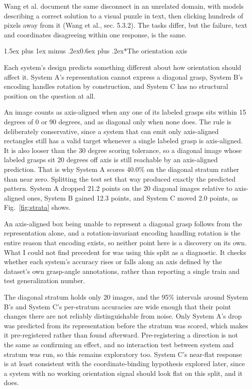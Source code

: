 \documentclass[12pt,letterpaper]{article}
\makeatletter
\renewcommand{\subsection}{\@startsection{subsection}{2}{0pt}%
  {1.5ex plus 1ex minus .2ex}{0.6ex plus .2ex}{\normalsize\itshape}}
\makeatother
\begin{document}
Wang et al. document the same disconnect in an unrelated domain, with
models describing a correct solution to a visual puzzle in text, then
clicking hundreds of pixels away from it (Wang et al., sec. 5.3.2). The
tasks differ, but the failure, text and coordinates disagreeing within
one response, is the same.

\subsection*{The orientation axis}

Each system's design predicts something different about how orientation
should affect it. System A's representation cannot express a diagonal
grasp, System B's encoding handles rotation by construction, and System
C has no structural position on the question at all.

An image counts as axis-aligned when any one of its labeled grasps sits
within 15 degrees of 0 or 90 degrees, and as diagonal only when none
does. The rule is deliberately conservative, since a system that can
emit only axis-aligned rectangles still has a valid target whenever a
single labeled grasp is axis-aligned. It is also looser than the 30
degree scoring tolerance, so a diagonal image whose labeled grasps sit
20 degrees off axis is still reachable by an axis-aligned prediction.
That is why System A scores 40.0\% on the diagonal stratum rather than
near zero. Splitting the test set that way
produced exactly the predicted pattern. System A dropped 21.2 points on
the 20 diagonal images relative to axis-aligned ones, System B gained
12.3 points, and System C moved 2.0 points, as Fig.~\ref{fig:strata}
shows.

An axis-aligned box being unable to represent a diagonal grasp follows
from the representation alone, and a rotation-invariant encoding
handling rotation is the entire reason that encoding exists, so neither
point here is a discovery on its own. What I could not find precedent
for was using this split as a diagnostic. It checks whether each
system's accuracy rises or falls along an axis defined by the dataset's
own grasp-angle annotations, rather than reporting a single train and
test generalization number.

The diagonal stratum holds only 20 images, and the 95\% intervals
around System B's and System C's per-stratum accuracies are wide enough
that their point changes there are not reliably distinguishable from
noise. Only System A's drop was predicted from its representation
before the stratum was scored, which makes it pre-registered rather
than found afterward. Pre-registering a direction is not the same as
confirming an effect, and no interaction test between system and
stratum was run, so this remains exploratory too. System C's near-flat
response is at least consistent with the coordinate-binding hypothesis
explored later, since a system with no working orientation signal
should look flat on this split, and it does.
\end{document}
